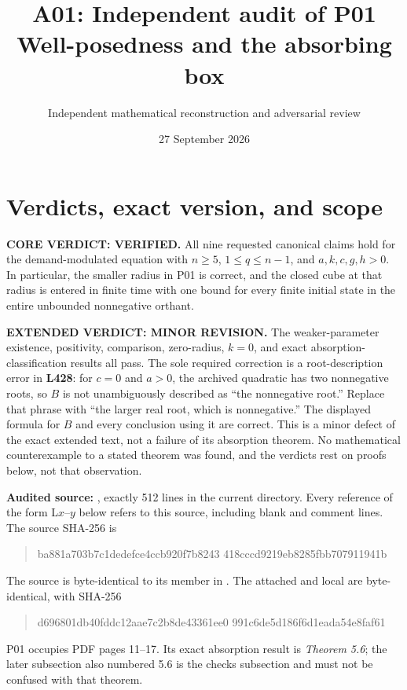 \documentclass[11pt]{article}
\title{A01: Independent audit of P01\\Well-posedness and the absorbing box}
\author{Independent mathematical reconstruction and adversarial review}
\date{27 September 2026}
\newcommand{\lin}[1]{\textbf{L#1}}
\begin{document}
\maketitle

\section{Verdicts, exact version, and scope}

\textbf{CORE VERDICT: VERIFIED.}
All nine requested canonical claims hold for the demand-modulated equation
with $n\geq5$, $1\leq q\leq n-1$, and $a,k,c,g,h>0$. In particular,
the smaller radius in P01 is correct, and the closed cube at that radius
is entered in finite time with one bound for every finite initial state
in the entire unbounded nonnegative orthant.

\textbf{EXTENDED VERDICT: MINOR REVISION.}
The weaker-parameter existence, positivity, comparison, zero-radius,
$k=0$, and exact absorption-classification results all pass. The sole
required correction is a root-description error in \lin{428}: for
$c=0$ and $a>0$, the archived quadratic has two nonnegative roots, so
$B$ is not unambiguously described as ``the nonnegative root.'' Replace
that phrase with ``the larger real root, which is nonnegative.'' The
displayed formula for $B$ and every conclusion using it are correct.
This is a minor defect of the exact extended text, not a failure of its
absorption theorem. No mathematical counterexample to a stated theorem
was found, and the verdicts rest on proofs below, not that observation.

\textbf{Audited source:}
, exactly 512 lines
in the current  directory. Every reference
of the form L$x$--$y$ below refers to this source, including blank and
comment lines. The source SHA-256 is
\begin{quote}\small\ttfamily
ba881a703b7c1dedefce4ccb920f7b8243\allowbreak
418cccd9219eb8285fbb707911941b
\end{quote}
The source is byte-identical to its member in
. The attached and local
 are byte-identical, with SHA-256
\begin{quote}\small\ttfamily
d696801db40fddc12aae7c2b8de43361ee0\allowbreak
991c6de5d186f6d1eada54e8faf61
\end{quote}
P01 occupies PDF pages 11--17. Its exact absorption result is
\emph{Theorem 5.6}; the later subsection also numbered 5.6 is the
checks subsection and must not be confused with that theorem.
\end{document}

